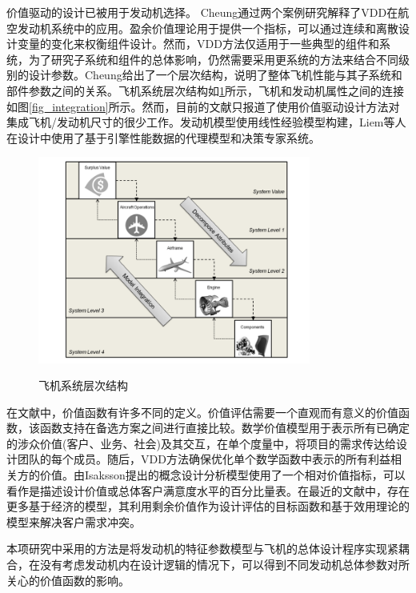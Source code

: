 \documentclass[12pt,a4paper]{report}
\begin{document}
价值驱动的设计已被用于发动机选择。 Cheung\cite{627cheung2012application}通过两个案例研究解释了VDD在航空发动机系统中的应用。盈余价值理论用于提供一个指标，可以通过连续和离散设计变量的变化来权衡组件设计。然而，VDD方法仅适用于一些典型的组件和系统，为了研究子系统和组件的总体影响，仍然需要采用更系统的方法来结合不同级别的设计参数。Cheung给出了一个层次结构，说明了整体飞机性能与其子系统和部件参数之间的关系。飞机系统层次结构如\ref{fig_chain}所示，飞机和发动机属性之间的连接如图\ref{fig_integration}所示。然而，目前的文献只报道了使用价值驱动设计方法对集成飞机/发动机尺寸的很少工作。发动机模型使用线性经验模型构建，Liem\cite{liem2015surrogate}等人在设计中使用了基于引擎性能数据的代理模型和决策专家系统。

\begin{figure}[ht!]
  \centering
  \includegraphics[width=0.8\textwidth]{aircraft-subsystem-chain.png}\\
  \caption{飞机系统层次结构}
  \label{fig_chain}
\end{figure}

在文献中，价值函数有许多不同的定义。价值评估需要一个直观而有意义的价值函数，该函数支持在备选方案之间进行直接比较。数学价值模型用于表示所有已确定的涉众价值(客户、业务、社会)及其交互，在单个度量中，将项目的需求传达给设计团队的每个成员。随后，VDD方法确保优化单个数学函数中表示的所有利益相关方的价值。由Isaksson提出的概念设计分析模型使用了一个相对价值指标\cite{1297monceaux2014overview}，可以看作是描述设计价值或总体客户满意度水平的百分比量表。在最近的文献中，存在更多基于经济的模型，其利用剩余价值作为设计评估的目标函数和基于效用理论的模型来解决客户需求冲突。

本项研究中采用的方法是将发动机的特征参数模型与飞机的总体设计程序实现紧耦合，在没有考虑发动机内在设计逻辑的情况下，可以得到不同发动机总体参数对所关心的价值函数的影响。
\end{document}
